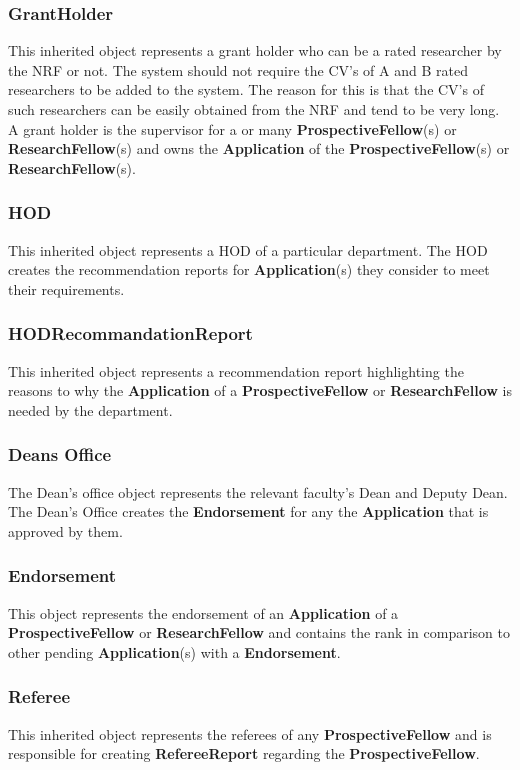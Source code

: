 \documentclass[12pt]{article}
\begin{document}
\subsubsection{GrantHolder}
This inherited object represents a grant holder who can be a rated researcher by the NRF or not. The system should not require the CV's of A and B rated researchers to be added to the system. The reason for this is that the CV's of such researchers can be easily obtained from the NRF and tend to be very long. A grant holder is the supervisor for a or many \textbf{ProspectiveFellow}(s) or \textbf{ResearchFellow}(s) and owns the \textbf{Application} of the \textbf{ProspectiveFellow}(s) or \textbf{ResearchFellow}(s).

\subsubsection{HOD}
This inherited object represents a HOD of a particular department. The HOD creates the recommendation reports for \textbf{Application}(s) they consider to meet their requirements.\\

\subsubsection{HODRecommandationReport}
This inherited object represents a recommendation report highlighting the reasons to why the \textbf{Application} of a \textbf{ProspectiveFellow} or \textbf{ResearchFellow} is needed by the department.

\subsubsection{Deans Office}
The Dean's office object represents the relevant faculty's Dean and Deputy Dean. The Dean's Office creates the \textbf{Endorsement} for any the \textbf{Application} that is approved by them.

\subsubsection{Endorsement}
This object represents the endorsement of an \textbf{Application} of a \textbf{ProspectiveFellow} or \textbf{ResearchFellow} and contains the rank in comparison to other pending \textbf{Application}(s) with a \textbf{Endorsement}.

\subsubsection{Referee}
This inherited object represents the referees of any \textbf{ProspectiveFellow} and is responsible for creating \textbf{RefereeReport} regarding the \textbf{ProspectiveFellow}.
\end{document}
